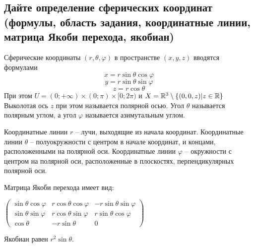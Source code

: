 \subsection{Дайте определение сферических координат (формулы, область задания, координатные линии, матрица Якоби перехода, якобиан)}

Сферические координаты $(r, \theta, \varphi)$ в пространстве $(x, y, z)$ вводятся формулами
\[ x = r \sin \theta \cos \varphi \]
\[ y = r \sin \theta \sin \varphi \]
\[ z = r \cos \theta \]
При этом $U = (0; +\infty) \times (0; \pi) \times [0; 2\pi)$ и $X = \mathbb{R}^3 \setminus \{(0, 0, z) | z \in \mathbb{R} \}$
Выколотая ось $z$ при этом называется полярной осью. Угол $\theta$ называется полярным углом, а угол $\varphi$ называется азимутальным углом.

Координатные линии $r$ -- лучи, выходящие из начала координат. Координатные линии $\theta$ -- полуокружности с центром в начале координат,
и концами, расположенными на полярной оси. Координатные линии $\varphi$ -- окружности с центром на полярной оси, расположенные в плоскостях, 
перпендикулярных полярной оси.

Матрица Якоби перехода имеет вид:

$
\begin{pmatrix}
    \sin \theta \cos \varphi & r \cos \theta \cos \varphi & -r \sin \theta \sin \varphi\\
    \sin \theta \sin \varphi & r \cos \theta \sin \varphi & r \sin \theta \cos \varphi \\
    \cos \theta              & -r \sin \theta             & 0
\end{pmatrix}
$

Якобиан равен $r^2 \sin \theta$.